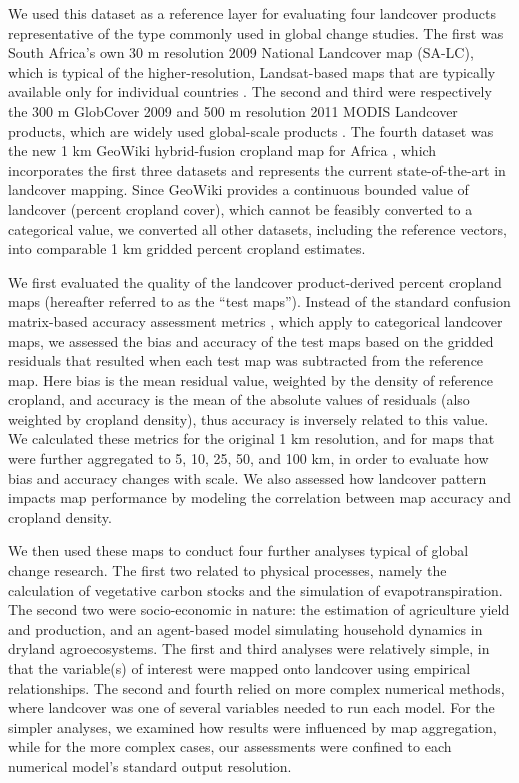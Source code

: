 \documentclass{pnastwo}
\begin{document}
\begin{article}
We used this dataset as a reference layer for evaluating four landcover products representative of the type commonly used in global change studies. The first was South Africa's own 30 m resolution 2009 National Landcover map (SA-LC)\cite{sanbi_national_2009}, which is typical of the higher-resolution, Landsat-based maps that are typically available only for individual countries \cite[e.g.][]{fry_completion_2009}. The second and third were respectively the 300 m GlobCover 2009 \cite{arino_global_2012} and 500 m resolution 2011 MODIS Landcover products, which are widely used global-scale products \cite[e.g.][]{gross_monitoring_2013, shackelford_conservation_2015}. The fourth dataset was the new 1 km GeoWiki hybrid-fusion cropland map for Africa \cite{fritz_mapping_2015}, which incorporates the first three datasets and represents the current state-of-the-art in landcover mapping.  Since GeoWiki provides a continuous bounded value of landcover (percent cropland cover), which cannot be feasibly converted to a categorical value, we converted all other datasets, including the reference vectors, into comparable 1 km gridded percent cropland estimates. 

We first evaluated the quality of the landcover product-derived percent cropland maps (hereafter referred to as the ``test maps''). Instead of the standard confusion matrix-based accuracy assessment metrics \cite{olofsson_good_2014,olofsson_making_2013}, which apply to categorical landcover maps, we assessed the bias and accuracy of the test maps based on the gridded residuals that resulted when each test map was subtracted from the reference map. Here bias is the mean residual value, weighted by the density of reference cropland, and accuracy is the mean of the absolute values of residuals (also weighted by cropland density), thus accuracy is inversely related to this value. We calculated these metrics for the original 1 km resolution, and for maps that were further aggregated to 5, 10, 25, 50, and 100 km, in order to evaluate how bias and accuracy changes with scale. We also assessed how landcover pattern impacts map performance by modeling the correlation between map accuracy and cropland density.  

We then used these maps to conduct four further analyses typical of global change research. The first two related to physical processes, namely the calculation of vegetative carbon stocks and the simulation of evapotranspiration. The second two were socio-economic in nature: the estimation of agriculture yield and production, and an agent-based model simulating household dynamics in dryland agroecosystems.  The first and third analyses were relatively simple, in that the variable(s) of interest were mapped onto landcover using empirical relationships. The second and fourth relied on more complex numerical methods, where landcover was one of several variables needed to run each model. For the simpler analyses, we examined how results were influenced by map aggregation, while for the more complex cases, our assessments were confined to each numerical model's standard output resolution. 


\end{article}
\end{document}
